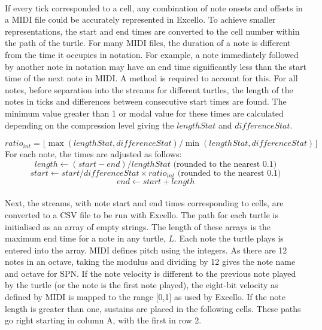 \paragraph{} If every tick corresponded to a cell, any combination of note onsets and offsets in a MIDI file could be accurately represented in Excello. To achieve smaller representations, the start and end times are converted to the cell number within the path of the turtle. For many MIDI files, the duration of a note is different from the time it occupies in notation. For example, a note immediately followed by another note in notation may have an end time significantly less than the start time of the next note in MIDI. A method is required to account for this. For all notes, before separation into the streams for different turtles, the length of the notes in ticks and differences between consecutive start times are found. The minimum value greater than 1 or modal value for these times are calculated depending on the compression level giving the $lengthStat$ and $differenceStat$.

  $$ratio_{int} = \lfloor\max(lengthStat, differenceStat)/\min(lengthStat, differenceStat)\rfloor$$
For each note, the times are adjusted as follows:
  $$length \gets (start - end) / lengthStat \text{ (rounded to the nearest 0.1)}$$
  $$start \gets start / differenceStat \times ratio_{int} \text{ (rounded to the nearest 0.1)}$$
  $$end \gets start +length$$

\paragraph{} Next, the streams, with note start and end times corresponding to cells, are converted to a CSV file to be run with Excello. The path for each turtle is initialised as an array of empty strings. The length of these arrays is the maximum end time for a note in any turtle, $L$.  Each note the turtle plays is entered into the array. MIDI defines pitch using the integers. As there are 12 notes in an octave, taking the modulus and dividing by 12 gives the note name and octave for SPN. If the note velocity is different to the previous note played by the turtle (or the note is the first note played), the eight-bit velocity as defined by MIDI is mapped to the range [0,1] as used by Excello. If the note length is greater than one, sustains are placed in the following cells. These paths go right starting in column A, with the first in row 2.

